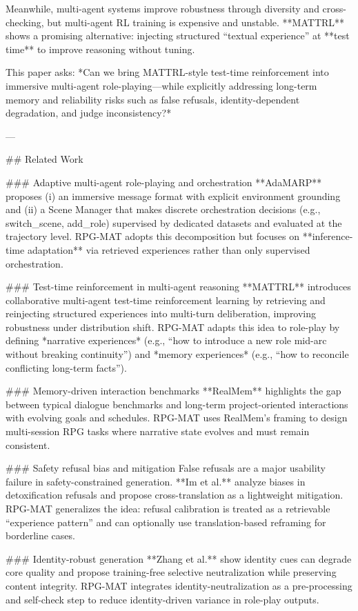 Meanwhile, multi-agent systems improve robustness through diversity and cross-checking, but multi-agent RL training is expensive and unstable. **MATTRL** shows a promising alternative: injecting structured “textual experience” at **test time** to improve reasoning without tuning.  

This paper asks: *Can we bring MATTRL-style test-time reinforcement into immersive multi-agent role-playing—while explicitly addressing long-term memory and reliability risks such as false refusals, identity-dependent degradation, and judge inconsistency?*

---

## Related Work  

### Adaptive multi-agent role-playing and orchestration  
**AdaMARP** proposes (i) an immersive message format with explicit environment grounding and (ii) a Scene Manager that makes discrete orchestration decisions (e.g., switch_scene, add_role) supervised by dedicated datasets and evaluated at the trajectory level. RPG-MAT adopts this decomposition but focuses on **inference-time adaptation** via retrieved experiences rather than only supervised orchestration.

### Test-time reinforcement in multi-agent reasoning  
**MATTRL** introduces collaborative multi-agent test-time reinforcement learning by retrieving and reinjecting structured experiences into multi-turn deliberation, improving robustness under distribution shift. RPG-MAT adapts this idea to role-play by defining *narrative experiences* (e.g., “how to introduce a new role mid-arc without breaking continuity”) and *memory experiences* (e.g., “how to reconcile conflicting long-term facts”).

### Memory-driven interaction benchmarks  
**RealMem** highlights the gap between typical dialogue benchmarks and long-term project-oriented interactions with evolving goals and schedules. RPG-MAT uses RealMem’s framing to design multi-session RPG tasks where narrative state evolves and must remain consistent.

### Safety refusal bias and mitigation  
False refusals are a major usability failure in safety-constrained generation. **Im et al.** analyze biases in detoxification refusals and propose cross-translation as a lightweight mitigation. RPG-MAT generalizes the idea: refusal calibration is treated as a retrievable “experience pattern” and can optionally use translation-based reframing for borderline cases.

### Identity-robust generation  
**Zhang et al.** show identity cues can degrade core quality and propose training-free selective neutralization while preserving content integrity. RPG-MAT integrates identity-neutralization as a pre-processing and self-check step to reduce identity-driven variance in role-play outputs.

